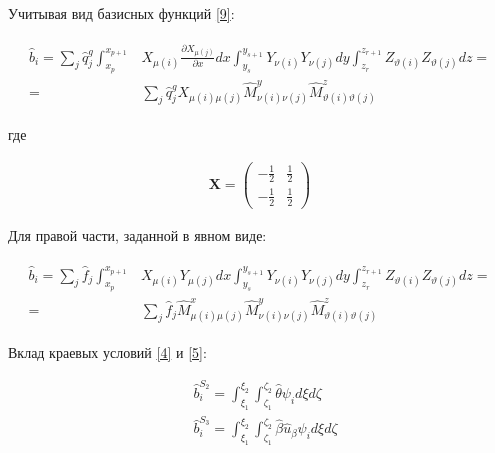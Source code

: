 \documentclass[12pt, a4paper]{article}
\begin{document}
\vspace{3mm}
\noindent Учитывая вид базисных функций \ref{9}:

\begin{align}
  \begin{split}
    \hat{b}_i 
    = \sum_{j}\hat{q}_j^g
      \int_{x_p}^{x_{p+1}}&X_{\mu(i)}\frac{\partial{X_{\mu(j)}}}{\partial{x}}dx
      \int_{y_s}^{y_{s+1}}Y_{\nu(i)}Y_{\nu(j)}dy
      \int_{z_r}^{z_{r+1}}Z_{\vartheta(i)}Z_{\vartheta(j)}dz = \\
    = &\sum_{j}\hat{q}_j^g 
      X_{\mu(i)\mu(j)} 
      \hat{M}_{\nu(i)\nu(j)}^y 
      \hat{M}_{\vartheta(i)\vartheta(j)}^z
  \end{split}
\end{align}

\noindent где

\begin{align}
  \textbf{X} = 
    \begin{pmatrix}
      -\frac{1}{2} & \frac{1}{2} \\
      -\frac{1}{2} & \frac{1}{2}
    \end{pmatrix}
\end{align}

\vspace{3mm}
\noindent Для правой части, заданной в явном виде:

\begin{align}
  \begin{split}
    \hat{b}_i 
    = \sum_{j}\hat{f}_j
      \int_{x_p}^{x_{p+1}}&X_{\mu(i)}Y_{\mu(j)}dx
      \int_{y_s}^{y_{s+1}}Y_{\nu(i)}Y_{\nu(j)}dy
      \int_{z_r}^{z_{r+1}}Z_{\vartheta(i)}Z_{\vartheta(j)}dz = \\
    = &\sum_{j}\hat{f}_j 
      \hat{M}_{\mu(i)\mu(j)}^x 
      \hat{M}_{\nu(i)\nu(j)}^y 
      \hat{M}_{\vartheta(i)\vartheta(j)}^z
  \end{split}
\end{align}

\vspace{3mm}
\noindent Вклад краевых условий \ref{4} и \ref{5}:

\begin{align}
  &\hat{b}_{i}^{S_2} =  \int_{\xi_1}^{\xi_2}
                        \int_{\zeta_1}^{\zeta_2}
                        \hat{\theta}\psi_{i} d\xi d\zeta \\
  &\hat{b}_{i}^{S_3} =  \int_{\xi_1}^{\xi_2}
                      \int_{\zeta_1}^{\zeta_2}
                      \hat{\beta}\hat{u}_{\beta}\psi_{i} d\xi d\zeta
\end{align}
\end{document}
